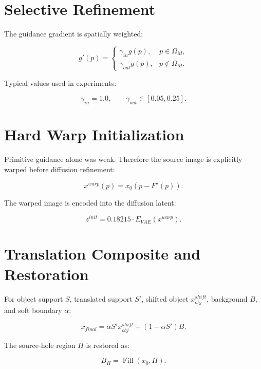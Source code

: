 \documentclass[11pt,a4paper]{article}
\begin{document}
\section{Selective Refinement}

The guidance gradient is spatially weighted:

\begin{equation}
g'(p)=
\begin{cases}
\gamma_{in}g(p), & p\in\Omega_M,\\
\gamma_{out}g(p), & p\notin\Omega_M.
\end{cases}
\end{equation}

Typical values used in experiments:

\begin{equation}
\gamma_{in}=1.0,\qquad \gamma_{out}\in[0.05,0.25].
\end{equation}

\section{Hard Warp Initialization}

Primitive guidance alone was weak. Therefore the source image is explicitly warped before diffusion refinement:

\begin{equation}
x^{warp}(p)=x_0(p-F^\star(p)).
\end{equation}

The warped image is encoded into the diffusion latent:

\begin{equation}
z^{init}=0.18215\cdot E_{VAE}(x^{warp}).
\end{equation}

\section{Translation Composite and Restoration}

For object support \(S\), translated support \(S'\), shifted object \(x_{obj}^{shift}\), background \(B\), and soft boundary \(\alpha\):

\begin{equation}
x_{final}
=
\alpha S'x_{obj}^{shift}
+
(1-\alpha S')B.
\end{equation}

The source-hole region \(H\) is restored as:

\begin{equation}
B_H=\operatorname{Fill}(x_0,H).
\end{equation}
\end{document}
